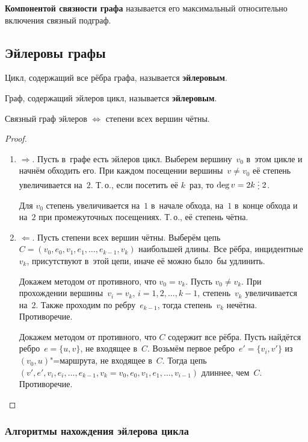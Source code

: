  \textbf{Компонентой связности графа} называется его максимальный относительно включения связный подграф.

\subsection{Эйлеровы графы}
Цикл, содержащий все рёбра графа, называется \textbf{эйлеровым}.

 Граф, содержащий эйлеров цикл, называется \textbf{эйлеровым}.

\begin{theorem}
Связный граф эйлеров $\Leftrightarrow$ степени всех вершин чётны.
\end{theorem}
\begin{proof}
\begin{enumerate}
	\item $\Rightarrow$. Пусть в~графе есть эйлеров цикл.
	Выберем вершину~$v_0$ в~этом цикле и начнём обходить его.
	При каждом посещении вершины~$v \neq v_0$ её степень увеличивается на~$2$.
	Т.\,о., если посетить её $k$~раз, то $\deg v = 2k \mult 2$.
	
	Для $v_0$ степень увеличивается на~$1$ в~начале обхода, на~$1$ в~конце обхода и на~$2$ при промежуточных посещениях.
	Т.\,о., её степень чётна.
	
	\item $\Leftarrow$. Пусть степени всех вершин чётны.
	Выберём цепь~$C = (v_0, e_0, v_1, e_1, \ldots, e_{k-1}, v_k)$ наибольшей длины.
	Все рёбра, инцидентные~$v_k$, присутствуют в~этой цепи, иначе её можно было~бы удлинить.
	
	Докажем методом от противного, что $v_0 = v_k$.
	Пусть $v_0 \neq v_k$.
	При прохождении вершины~$v_i = v_k$, $i = 1, 2, \ldots, k - 1$, степень~$v_k$ увеличивается на~$2$.
	Также проходим по ребру~$e_{k-1}$, тогда степень~$v_k$ нечётна.
	Противоречие.
	
	Докажем методом от противного, что $C$ содержит все рёбра.	
	Пусть найдётся ребро~$e = \{ u, v \}$, не входящее в~$C$.
	Возьмём первое ребро~$e' = \{ v_i, v' \}$ из $(v_0, u)$"=маршрута, не входящее в~$C$.
	Тогда цепь~$(v', e', v_i, e_i, \ldots, e_{k-1}, \allowbreak v_k = v_0, \allowbreak e_0, v_1, e_1, \ldots, v_{i-1})$ длиннее, чем~$C$.
	Противоречие.
\end{enumerate}
\end{proof}

\subsubsection{Алгоритмы нахождения эйлерова цикла}

